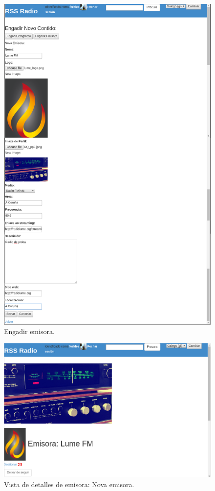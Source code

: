 \begin{figure}[h]
	\centering
	\includegraphics[scale=0.37,keepaspectratio=true]{./images/usermanual/um-add-station.png}
	\caption{Engadir emisora.}
	\label{fig:um-add-station}
\end{figure}

\begin{figure}[h]
	\centering
	\includegraphics[scale=0.43,keepaspectratio=true]{./images/usermanual/um-stationd2.png}
	\caption{Vista de detalles de emisora: Nova emisora.}
	\label{fig:um-stationd2}
\end{figure}

